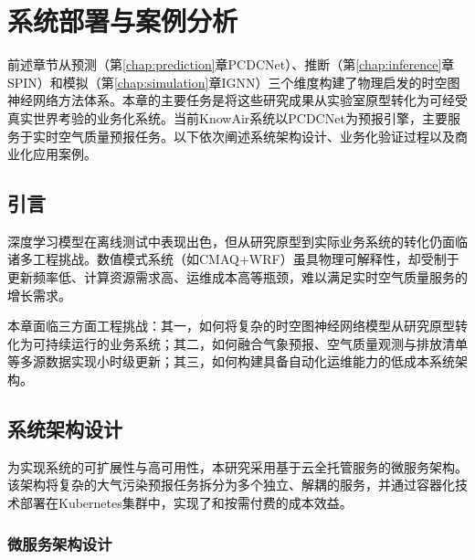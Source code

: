 
\chapter{系统部署与案例分析}
\label{chap:deployment}

前述章节从预测（第\ref{chap:prediction}章PCDCNet）、推断（第\ref{chap:inference}章SPIN）和模拟（第\ref{chap:simulation}章IGNN）三个维度构建了物理启发的时空图神经网络方法体系。本章的主要任务是将这些研究成果从实验室原型转化为可经受真实世界考验的业务化系统。当前KnowAir系统以PCDCNet为预报引擎，主要服务于实时空气质量预报任务。以下依次阐述系统架构设计、业务化验证过程以及商业化应用案例。

\section{引言}
\label{sec:deploy_intro}

深度学习模型在离线测试中表现出色，但从研究原型到实际业务系统的转化仍面临诸多工程挑战。数值模式系统（如CMAQ{+}WRF）虽具物理可解释性，却受制于更新频率低、计算资源需求高、运维成本高等瓶颈，难以满足实时空气质量服务的增长需求。

本章面临三方面工程挑战：其一，如何将复杂的时空图神经网络模型从研究原型转化为可持续运行的业务系统；其二，如何融合气象预报、空气质量观测与排放清单等多源数据实现小时级更新；其三，如何构建具备自动化运维能力的低成本系统架构。


\section{系统架构设计}
\label{sec:system_arch}

为实现系统的可扩展性与高可用性，本研究采用基于云全托管服务的微服务架构。该架构将复杂的大气污染预报任务拆分为多个独立、解耦的服务，并通过容器化技术部署在Kubernetes集群中，实现了和按需付费的成本效益。


\subsection{微服务架构设计}
\label{subsec:microservice}

